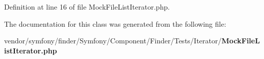 Definition at line 16 of file Mock\+File\+List\+Iterator.\+php.



The documentation for this class was generated from the following file\+:\begin{DoxyCompactItemize}
\item 
vendor/symfony/finder/\+Symfony/\+Component/\+Finder/\+Tests/\+Iterator/{\bf Mock\+File\+List\+Iterator.\+php}\end{DoxyCompactItemize}
